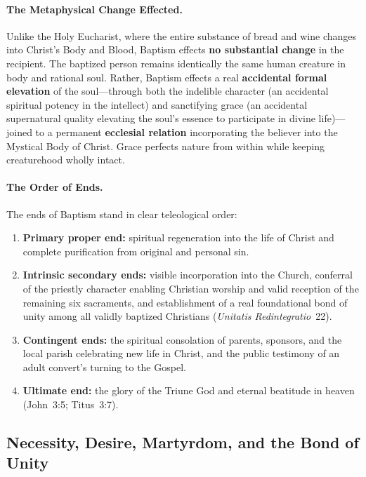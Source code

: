 \paragraph{The Metaphysical Change Effected.}
Unlike the Holy Eucharist, where the entire substance of bread and wine changes into Christ's Body and Blood, Baptism effects \textbf{no substantial change} in the recipient. The baptized person remains identically the same human creature in body and rational soul. Rather, Baptism effects a real \textbf{accidental formal elevation} of the soul---through both the indelible character (an accidental spiritual potency in the intellect) and sanctifying grace (an accidental supernatural quality elevating the soul's essence to participate in divine life)---joined to a permanent \textbf{ecclesial relation} incorporating the believer into the Mystical Body of Christ. Grace perfects nature from within while keeping creaturehood wholly intact.

\paragraph{The Order of Ends.}
The ends of Baptism stand in clear teleological order:
\begin{enumerate}
  \item \textbf{Primary proper end:} spiritual regeneration into the life of Christ and complete purification from original and personal sin.
  \item \textbf{Intrinsic secondary ends:} visible incorporation into the Church, conferral of the priestly character enabling Christian worship and valid reception of the remaining six sacraments, and establishment of a real foundational bond of unity among all validly baptized Christians (\emph{Unitatis Redintegratio}~22).
  \item \textbf{Contingent ends:} the spiritual consolation of parents, sponsors, and the local parish celebrating new life in Christ, and the public testimony of an adult convert's turning to the Gospel.
  \item \textbf{Ultimate end:} the glory of the Triune God and eternal beatitude in heaven (John~3:5; Titus~3:7).
\end{enumerate}

\subsection{Necessity, Desire, Martyrdom, and the Bond of Unity}
\label{subsec:baptism-necessity}

